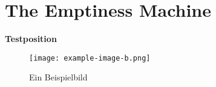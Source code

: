 \documentclass[twocolumn, chapterprefix]{article}
\begin{document}
\section{The Emptiness Machine}
\lipsum[1-6] %

\textbf{Testposition}
\begin{figure}[ht]
    \centering
    \texttt{[image: example-image-b.png]}
    \caption{Ein Beispielbild}
\end{figure}

\lipsum[6-12] %
\end{document}
